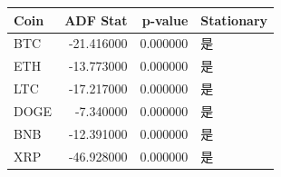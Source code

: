 \begin{tabular}{lrrl}
\toprule
Coin & ADF Stat & p-value & Stationary \\
\midrule
BTC & -21.416000 & 0.000000 & 是 \\
ETH & -13.773000 & 0.000000 & 是 \\
LTC & -17.217000 & 0.000000 & 是 \\
DOGE & -7.340000 & 0.000000 & 是 \\
BNB & -12.391000 & 0.000000 & 是 \\
XRP & -46.928000 & 0.000000 & 是 \\
\bottomrule
\end{tabular}
